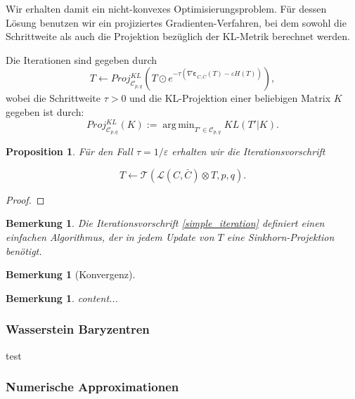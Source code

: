 \documentclass[twoside, 12pt,a4paper]{article}
\DeclareMathOperator*{\argmin}{arg\,min}
\newtheorem{proposition}[theorem]{Proposition}
\newtheorem{remark}[theorem]{Bemerkung}
\numberwithin{equation}{section}
\begin{document}
	Wir erhalten damit ein nicht-konvexes Optimisierungsproblem. Für dessen Lösung benutzen wir ein projiziertes Gradienten-Verfahren, bei dem sowohl die Schrittweite als auch die Projektion bezüglich der KL-Metrik berechnet werden.
	
	Die Iterationen sind gegeben durch
	\begin{equation}
		T \leftarrow Proj_{\mathcal{C}_{p,q}}^{KL} \left(T \odot e^{-\tau( \nabla \boldsymbol{\varepsilon}_{C, \bar{C}}(T) -\varepsilon H(T))} \right),
	\end{equation}
	wobei die Schrittweite $\tau > 0$ und die KL-Projektion einer beliebigen Matrix $K$ gegeben ist durch:
	\begin{equation}
		Proj_{\mathcal{C}_{p,q}}^{KL}(K) := \argmin_{T' \in \mathcal{C}_{p,q}} KL(T'|K).
	\end{equation}
	
	\begin{proposition}
		Für den Fall $\tau= 1/\varepsilon$ erhalten wir die Iterationsvorschrift
		
		\begin{equation}
			T \leftarrow \mathcal{T}(\mathcal{L} (C, \bar{C}) \otimes T,p,q). \label{simple_iteration}
		\end{equation}
	\end{proposition}
	
	\begin{proof}
	\end{proof}

\begin{remark}
	Die Iterationsvorschrift \ref{simple_iteration} definiert einen einfachen Algorithmus, der in jedem Update von $T$ eine Sinkhorn-Projektion benötigt.
\end{remark}

\begin{remark}[Konvergenz]

\end{remark}
		
	

\begin{remark}
	content...
\end{remark}

\subsubsection{Wasserstein Baryzentren}
test
	\subsubsection{Numerische Approximationen}
	
\end{document}
